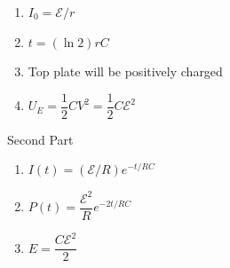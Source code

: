 \documentclass[10pt]{examdesign}
\begin{document}
\begin{shortanswer}[title={Free Response},rearrange=no,resetcounter=no]
\begin{question}
\begin{answer}
\begin{enumerate}
					\item $ I_0 = \mathcal{E}/r $
					\item $ t = (\ln 2)rC $
					\item Top plate will be positively charged
					\item $ U_E = \dfrac{1}{2} CV^2 = \dfrac{1}{2}C \mathcal{E} ^2$
				\end{enumerate}
				Second Part
				\begin{enumerate}
					\item $ I(t) = (\mathcal{E}/R)e^{-t/RC} $
					\item $ P(t) = \dfrac{\mathcal{E}^2}{R} e^{-2t/RC}$
					\item $ E = \dfrac{C \mathcal{E}^2}{2} $
				\end{enumerate}
			\end{answer}
		\end{question}
	\end{shortanswer}
\end{document}
